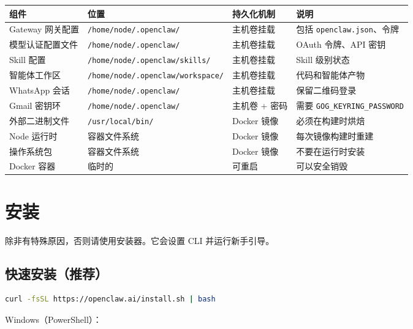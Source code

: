 \begin{table}[h]
\centering
\small
\begin{tabular}{|l|l|l|l|}
\hline
组件 & 位置 & 持久化机制 & 说明 \\
\hline
Gateway 网关配置 & \texttt{/home/node/.openclaw/} & 主机卷挂载 & 包括 \texttt{openclaw.json}、令牌 \\
\hline
模型认证配置文件 & \texttt{/home/node/.openclaw/} & 主机卷挂载 & OAuth 令牌、API 密钥 \\
\hline
Skill 配置 & \texttt{/home/node/.openclaw/skills/} & 主机卷挂载 & Skill 级别状态 \\
\hline
智能体工作区 & \texttt{/home/node/.openclaw/workspace/} & 主机卷挂载 & 代码和智能体产物 \\
\hline
WhatsApp 会话 & \texttt{/home/node/.openclaw/} & 主机卷挂载 & 保留二维码登录 \\
\hline
Gmail 密钥环 & \texttt{/home/node/.openclaw/} & 主机卷 + 密码 & 需要 \texttt{GOG\_KEYRING\_PASSWORD} \\
\hline
外部二进制文件 & \texttt{/usr/local/bin/} & Docker 镜像 & 必须在构建时烘焙 \\
\hline
Node 运行时 & 容器文件系统 & Docker 镜像 & 每次镜像构建时重建 \\
\hline
操作系统包 & 容器文件系统 & Docker 镜像 & 不要在运行时安装 \\
\hline
Docker 容器 & 临时的 & 可重启 & 可以安全销毁 \\
\hline
\end{tabular}
\end{table}




\clearpage

\section{安装}


除非有特殊原因，否则请使用安装器。它会设置 CLI 并运行新手引导。

\subsection{快速安装（推荐）}


\begin{lstlisting}[language=bash]
curl -fsSL https://openclaw.ai/install.sh | bash
\end{lstlisting}


Windows（PowerShell）：

